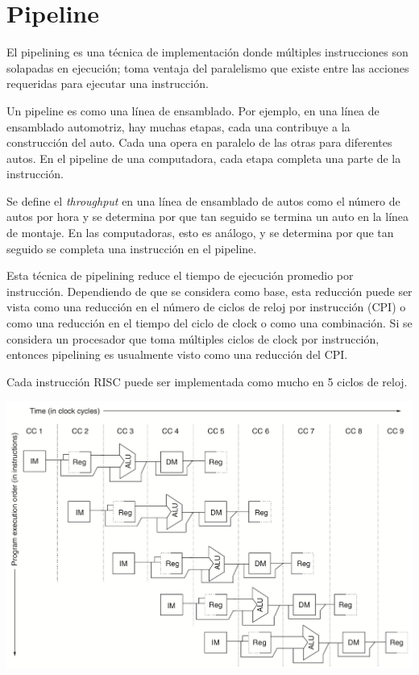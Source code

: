  
\chapter{Pipeline}
El pipelining es una técnica de implementación donde múltiples instrucciones son solapadas en ejecución; toma ventaja del paralelismo que existe entre las acciones requeridas para ejecutar una instrucción.

Un pipeline es como una línea de ensamblado. Por ejemplo, en una línea de ensamblado automotriz, hay muchas etapas, cada una contribuye a la construcción del auto. Cada una opera en paralelo de las otras para diferentes autos. En el pipeline de una computadora, cada etapa completa una parte de la instrucción.

Se define el \textit{throughput} en una línea de ensamblado de autos como el número de autos por hora y se determina por que tan seguido se termina un auto en la línea de montaje. En las computadoras, esto es análogo, y se determina por que tan seguido se completa una instrucción en el pipeline.

Esta técnica de pipelining reduce el tiempo de ejecución promedio por instrucción. Dependiendo de que se considera como base, esta reducción puede ser vista como una reducción en el número de ciclos de reloj por instrucción (CPI) o como una reducción en el tiempo del ciclo de clock o como una combinación. Si se considera un procesador que toma múltiples ciclos de clock por instrucción, entonces pipelining es usualmente visto como una reducción del CPI.

Cada instrucción RISC puede ser implementada como mucho en 5 ciclos de reloj.

\begin{center}
 \includegraphics[scale=.5,keepaspectratio=true]{gfx/pipeline2.png}
\end{center}


